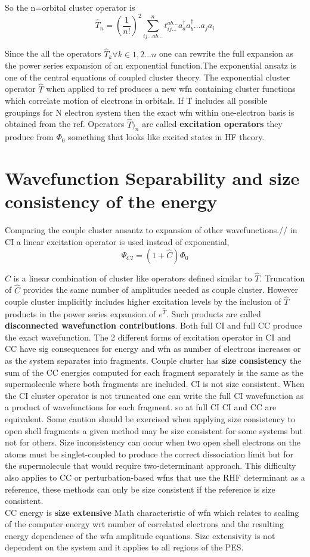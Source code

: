 \documentclass[10pt, draft]{article}
\begin{document}
So the n=orbital cluster operator is 
\[\hat{T}_n = (\frac{1}{n!})^2 \sum_{ij...ab...}^n t_{ij...}^{ab...}a_a^\dagger a_b^\dagger... a_j a_i \]

Since the all the operators $\hat{T}_k$$ \forall k \in 1,2...n$  one can rewrite the full expansion as the power series expansion of an exponential function.\linebreak[1]
The exponential ansatz is one of the central equations of coupled cluster theory.  The exponential cluster operator $\hat{T}$ when applied to ref produces a new wfn containing cluster functions which correlate motion of electrons in orbitals.  If T includes all possible groupings for N electron system then the exact wfn within one-electron basis is obtained from the ref.  Operators $\hat{T})_n$ are called \textbf{excitation operators} they produce from $\Phi_0$ something that looks like excited states in HF theory.  

\section{Wavefunction Separability and size consistency of the energy}
Comparing the couple cluster ansantz to expansion of other wavefunctions.//
in CI a linear excitation operator is used instead of exponential,
\[\Psi_{CI} = (1+\hat{C})\Phi_0\]

$\hat{C}$ is a linear combination of cluster like operators defined similar to $\hat{T}$.  Truncation of $\hat{C}$ provides the same number of amplitudes needed as couple cluster. However couple cluster implicitly includes higher excitation levels by the inclusion of $\hat{T}$ products in the power series expansion of $e^{\hat{T}}$.  Such products are called \textbf{disconnected wavefunction contributions}. Both full CI and full CC produce the exact wavefunction.  The 2 different forms of excitation operator in CI and CC have sig consequences for energy and wfn as number of electrons increases or as the system separates into fragments. Couple cluster has \textbf{size consistency} the sum of the CC energies computed for each fragment separately is the same as the supermolecule where both fragments are included.  CI is not size consistent. When the CI cluster operator is not truncated one can write the full CI wavefunction as a product of wavefunctions for each fragment. so at full CI CI and CC are equivalent.  Some caution should be exercised when applying size consistency to open shell fragments a given method may be size consistent for some systems but not for others.  Size inconsistency can occur when two open shell electrons on the atoms must be singlet-coupled to produce the correct dissociation limit but for the supermolecule that would require two-determinant approach.  This difficulty also applies to CC or perturbation-based wfns that use the RHF determinant as a reference, these methods can only be size consistent if the reference is size consistent.  \\
CC energy is \textbf{size extensive}  Math characteristic of wfn which relates to scaling of the computer energy wrt number of correlated electrons and the resulting energy dependence of the wfn amplitude equations.  Size extensivity is not dependent on the system and it applies to all regions of the PES.  
\end{document}
